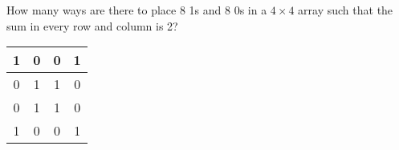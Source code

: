 How many ways are there to place 8 1s and 8 0s in a $4\times 4$ array such that the sum in every row and column is 2? 
    \begin{tabular}{|c|c|c|c|}
    \hline
        1 & 0 & 0 & 1 \\ \hline
        0 & 1 & 1 & 0 \\ \hline
        0 & 1 & 1 & 0 \\  \hline
        1 & 0 & 0 & 1 \\ \hline
    \end{tabular}